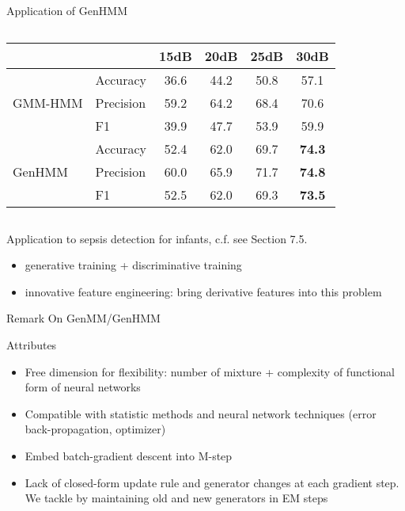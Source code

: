 \begin{frame}{Application of GenHMM}
\begin{columns}
\begin{table}
\begin{adjustbox}{width=0.90\textwidth}
\begin{tabular}{llcccc}
                                 && {15dB} &  {20dB} &  {25dB} & {30dB}  \\
          \midrule
          \multirow{3}{*}{GMM-HMM}
                                 & Accuracy & 36.6 &  44.2 &  50.8 & 57.1
          \\
                                 &Precision & 59.2 &  64.2 &  68.4 & 70.6  \\
                                 & F1       & 39.9 &  47.7 &  53.9 & 59.9 \\
          \midrule
          \multirow{3}{*}{GenHMM}
                                 & Accuracy & 52.4 & 62.0 &  69.7 & \textbf{74.3} \\
                                 &Precision & 60.0 &  65.9 &  71.7 & \textbf{74.8}  \\
                                 & F1       & 52.5 &  62.0 &  69.3 & \textbf{73.5} \\
          \bottomrule                                                                  
        \end{tabular}
      \end{adjustbox}
      \vspace{0.1cm}
    \end{table}
  \end{columns}
  
  \flushleft
  \vskip -0.5cm
  Application to sepsis detection for infants, c.f. see Section 7.5.
  \begin{itemize}[label=\textbullet]
  \item generative training + discriminative training
  \item innovative feature engineering: bring derivative features into this problem
  \end{itemize}
  

\end{frame}

\begin{frame}{Remark On GenMM/GenHMM}
  \begin{block}{Attributes}
    \begin{itemize}[label=\textbullet]
    \item Free dimension for flexibility: number of mixture + complexity of functional form of neural networks
    \item Compatible with statistic methods and neural network techniques (error back-propagation, optimizer)
    \item Embed batch-gradient descent into M-step
    \item Lack of closed-form update rule and generator changes at each gradient step. We tackle by maintaining old and new generators in EM steps
    \end{itemize}
    
  \end{block}
\end{frame}

